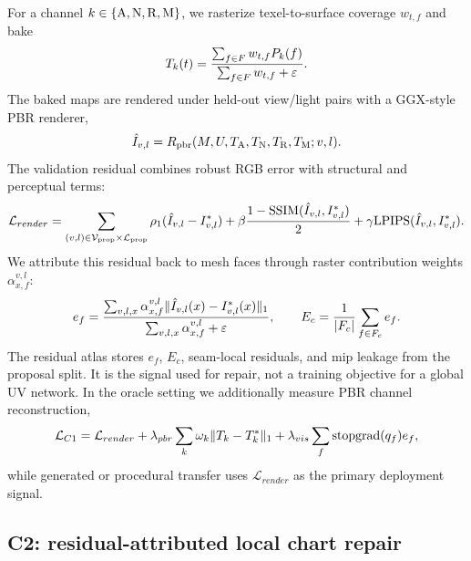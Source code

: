 For a channel \(k\in\{\mathrm{A},\mathrm{N},\mathrm{R},\mathrm{M}\}\), we rasterize texel-to-surface coverage \(w_{t,f}\) and bake
\begin{equation}
T_k(t)=
\frac{\sum_{f\in F} w_{t,f} P_k(f)}
     {\sum_{f\in F} w_{t,f}+\varepsilon}.
\label{eq:bake}
\end{equation}
The baked maps are rendered under held-out view/light pairs with a GGX-style PBR renderer,
\begin{equation}
\hat I_{v,l}=R_{\mathrm{pbr}}(M,U,T_{\mathrm{A}},T_{\mathrm{N}},T_{\mathrm{R}},T_{\mathrm{M}};v,l).
\label{eq:pbr_render}
\end{equation}
The validation residual combines robust RGB error with structural and perceptual terms:
\begin{equation}
\mathcal{L}_{render}=
\sum_{(v,l)\in\mathcal{V}_{\mathrm{prop}}\times\mathcal{L}_{\mathrm{prop}}}
\rho_1(\hat I_{v,l}-I^*_{v,l})
+\beta\frac{1-\mathrm{SSIM}(\hat I_{v,l},I^*_{v,l})}{2}
+\gamma\mathrm{LPIPS}(\hat I_{v,l},I^*_{v,l}).
\label{eq:render_loss}
\end{equation}
We attribute this residual back to mesh faces through raster contribution weights \(\alpha_{x,f}^{v,l}\):
\begin{equation}
e_f=
\frac{\sum_{v,l,x}\alpha_{x,f}^{v,l}
\|\hat I_{v,l}(x)-I^*_{v,l}(x)\|_1}
{\sum_{v,l,x}\alpha_{x,f}^{v,l}+\varepsilon},
\qquad
E_c=\frac{1}{|F_c|}\sum_{f\in F_c}e_f.
\label{eq:face_chart_residual}
\end{equation}
The residual atlas stores \(e_f\), \(E_c\), seam-local residuals, and mip leakage from the proposal split. It is the signal used for repair, not a training objective for a global UV network. In the oracle setting we additionally measure PBR channel reconstruction,
\begin{equation}
\mathcal{L}_{C1}=\mathcal{L}_{render}
+\lambda_{pbr}\sum_k\omega_k\|T_k-T^*_k\|_1
+\lambda_{vis}\sum_f \operatorname{stopgrad}(q_f)e_f,
\label{eq:c1_loss}
\end{equation}
while generated or procedural transfer uses \(\mathcal{L}_{render}\) as the primary deployment signal.

\subsection{C2: residual-attributed local chart repair}
\label{sec:c2}

